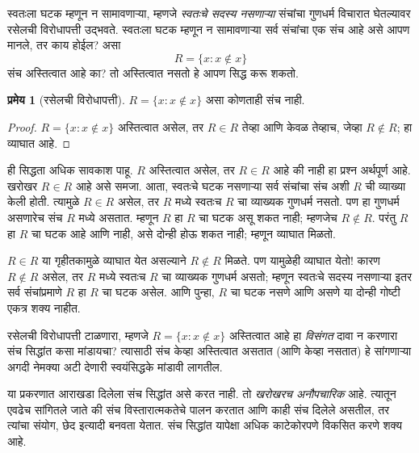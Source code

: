 \documentclass[11pt,a4paper,openany]{book}
\theoremstyle{definition}
\newtheorem{thm}[defn]{प्रमेय}
\newenvironment{explain}{}{}
\newenvironment{digress}{\par\smallskip}{\par\smallskip}
\newcommand{\Setabs}[2]{\{#1:#2\}}
\begin{document}
स्वतःला घटक म्हणून न सामावणाऱ्या, म्हणजे \emph{स्वतःचे सदस्य नसणाऱ्या}
संचांचा गुणधर्म विचारात घेतल्यावर रसेलची विरोधापत्ती उद्भवते.
स्वतःला घटक म्हणून न सामावणाऱ्या सर्व संचांचा एक संच आहे असे आपण
मानले, तर काय होईल? असा
\[
R = \Setabs{x}{x \notin x}
\]
संच अस्तित्वात आहे का? तो अस्तित्वात नसतो हे आपण सिद्ध करू शकतो.

\begin{thm}[रसेलची विरोधापत्ती]\label{sfr:set:rus:thm:russells-paradox}
	$R = \Setabs{x}{x \notin x}$ असा कोणताही संच नाही.
\end{thm}

\begin{proof}
$R = \Setabs{x}{x \notin x}$ अस्तित्वात असेल, तर
$R \in R$ तेव्हा आणि केवळ तेव्हाच, जेव्हा $R \notin R$; हा व्याघात आहे.
\end{proof}


\begin{explain}
ही सिद्धता अधिक सावकाश पाहू. $R$ अस्तित्वात असेल, तर $R \in
R$ आहे की नाही हा प्रश्न अर्थपूर्ण आहे. खरोखर $R \in R$ आहे असे समजा.
आता, स्वतःचे घटक नसणाऱ्या सर्व संचांचा संच अशी $R$ ची व्याख्या केली होती.
त्यामुळे $R \in R$ असेल, तर $R$ मध्ये स्वतःच $R$ चा व्याख्यक गुणधर्म नसतो.
पण हा गुणधर्म असणारेच संच $R$ मध्ये असतात. म्हणून $R$ हा $R$ चा
घटक असू शकत नाही; म्हणजेच $R \notin R$.
परंतु $R$ हा $R$ चा घटक आहे आणि नाही, असे दोन्ही होऊ शकत नाही;
म्हणून व्याघात मिळतो.

$R \in R$ या गृहीतकामुळे व्याघात येत असल्याने $R \notin R$ मिळते.
पण यामुळेही व्याघात येतो!{} कारण $R
\notin R$ असेल, तर $R$ मध्ये स्वतःच $R$ चा व्याख्यक गुणधर्म असतो;
म्हणून स्वतःचे सदस्य नसणाऱ्या इतर सर्व संचांप्रमाणे $R$ हा $R$ चा
घटक असेल. आणि पुन्हा, $R$ चा घटक नसणे आणि असणे
या दोन्ही गोष्टी एकत्र शक्य नाहीत.
\end{explain}


\begin{digress}
रसेलची विरोधापत्ती टाळणारा, म्हणजे $R = \Setabs{x}{x \notin x}$
अस्तित्वात आहे हा \emph{विसंगत} दावा न करणारा संच सिद्धांत कसा मांडायचा?
त्यासाठी संच केव्हा अस्तित्वात असतात (आणि केव्हा नसतात) हे सांगणाऱ्या
अगदी नेमक्या अटी देणारी स्वयंसिद्धके मांडावी लागतील.

या प्रकरणात आराखडा दिलेला संच सिद्धांत असे करत नाही. तो
\emph{खरोखरच अनौपचारिक} आहे. त्यातून एवढेच सांगितले जाते की संच
विस्तारात्मकतेचे पालन करतात आणि काही संच दिलेले असतील, तर त्यांचा संयोग,
छेद इत्यादी बनवता येतात. संच सिद्धांत यापेक्षा अधिक काटेकोरपणे विकसित करणे
शक्य आहे.
\end{digress}
\end{document}
